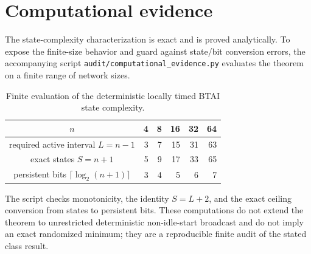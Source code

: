 \section{Computational evidence}\label{sec:computational-evidence}

The state-complexity characterization is exact and is proved analytically.  To expose the finite-size behavior and guard against state/bit conversion errors, the accompanying script \texttt{audit/computational\_evidence.py} evaluates the theorem on a finite range of network sizes.

\begin{table}[ht]
\centering
\begin{tabular}{c|rrrrr}
$n$ & 4 & 8 & 16 & 32 & 64 \\
\hline
required active interval $L=n-1$ & 3 & 7 & 15 & 31 & 63 \\
exact states $S=n+1$ & 5 & 9 & 17 & 33 & 65 \\
persistent bits $\lceil\log_2(n+1)\rceil$ & 3 & 4 & 5 & 6 & 7
\end{tabular}
\caption{Finite evaluation of the deterministic locally timed BTAI state complexity.}
\label{tab:local-timer-finite}
\end{table}

The script checks monotonicity, the identity $S=L+2$, and the exact ceiling conversion from states to persistent bits.  These computations do not extend the theorem to unrestricted deterministic non-idle-start broadcast and do not imply an exact randomized minimum; they are a reproducible finite audit of the stated class result.
